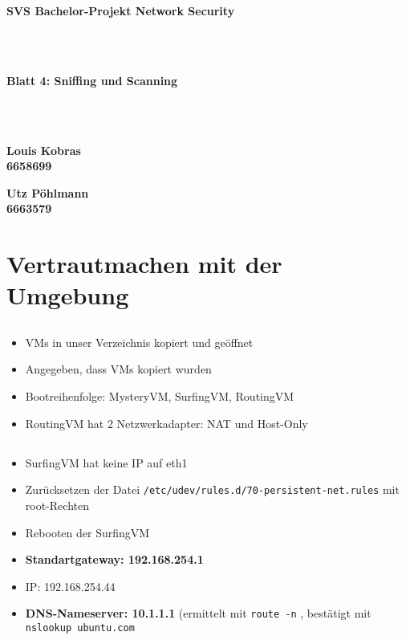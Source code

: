\documentclass[twoside]{article}
\newcommand{\ttt}[1]{%
	\texttt{#1}%
}
\begin{document}
\pagestyle{fancy}
\fancyhead{}
\fancyfoot{}

\begin{center}
\begin{Huge}
\textbf{SVS Bachelor-Projekt Network Security}
\end{Huge}\\\-\\
\begin{Large}
\textbf{Blatt 4: Sniffing und Scanning}
\end{Large}\\\-\\
\begin{minipage}[t]{0.48\textwidth}
\begin{center}\textbf{
	Louis Kobras\\
	6658699}
\end{center}
\end{minipage}
\begin{minipage}[t]{0.48\textwidth}
\begin{center}\textbf{
	Utz Pöhlmann\\
	6663579}
\end{center}
\end{minipage}
\end{center}

\section{Vertrautmachen mit der Umgebung}
\subsection{}
\begin{itemize}
	\item VMs in unser Verzeichnis kopiert und geöffnet
	\item Angegeben, dass VMs kopiert wurden
	\item Bootreihenfolge: MysteryVM, SurfingVM, RoutingVM
	\item RoutingVM hat 2 Netzwerkadapter: NAT und Host-Only
\end{itemize}
\subsection{}
\begin{itemize}
	\item SurfingVM hat keine IP auf eth1
	\item Zurücksetzen der Datei \ttt{/etc/udev/rules.d/70-persistent-net.rules} mit root-Rechten
	\item Rebooten der SurfingVM
	\item \textbf{Standartgateway: 192.168.254.1}
	\item IP: 192.168.254.44
	\item \textbf{DNS-Nameserver: 10.1.1.1} (ermittelt mit \ttt{route -n}, bestätigt mit \ttt{nslookup ubuntu.com}
\end{itemize}
\end{document}
